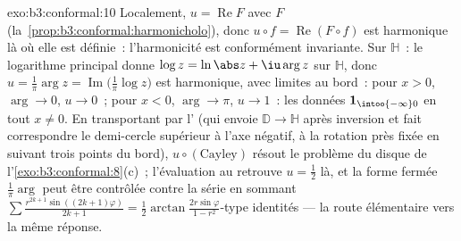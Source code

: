 \begin{solution}{exo:b3:conformal:10}
Localement, $u = \operatorname{Re}F$ avec $F$ 
(la~\cref{prop:b3:conformal:harmonicholo}), donc $u\circ f =
\operatorname{Re}(F\circ f)$ est harmonique là où elle est
définie~: l'harmonicité est conformément invariante. Sur
$\mathbb H$~: le logarithme principal donne $\log z =
\ln\abs z + \iu\arg z$  sur $\mathbb H$, donc $u =
\frac1\pi\arg z = \operatorname{Im}\bigl(\frac1\pi\log
z\bigr)$ est harmonique, avec limites au bord~: pour $x >
0$, $\arg \to 0$, $u \to 0$~; pour $x < 0$, $\arg \to \pi$,
$u \to 1$~: les données $\mathbf 1_{\intoo{-\infty}0}$ en
tout $x \neq 0$. En transportant par l' (qui envoie $\mathbb D \to \mathbb H$ après
inversion et fait correspondre le demi-cercle supérieur à
l'axe négatif, à la rotation près fixée en suivant trois
points du bord), $u\circ(\text{Cayley})$ résout le problème
du disque de l'\cref{exo:b3:conformal:8}(c)~; l'évaluation
au  retrouve $u = \frac12$ là, et la forme fermée
$\frac1\pi\arg$ peut être contrôlée contre la série en
sommant $\sum\frac{r^{2k+1}\sin((2k+1)\varphi)}{2k+1} =
\frac12\arctan\frac{2r\sin\varphi}{1 - r^2}$-type
identités --- la route élémentaire vers la même réponse.
\end{solution}

